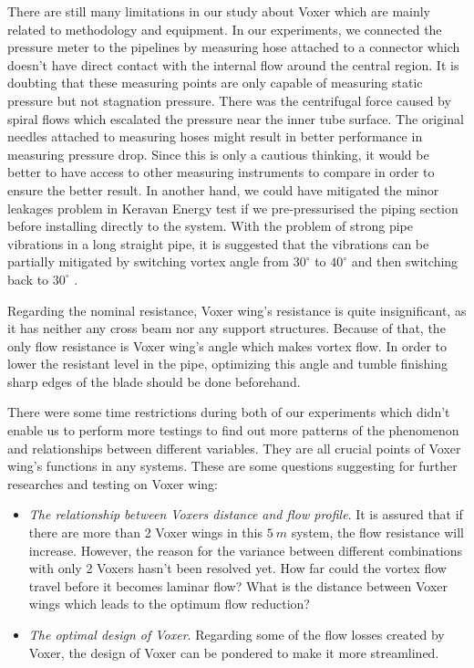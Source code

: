 There are still many limitations in our study about Voxer which are mainly related to methodology and equipment. In our experiments, we connected the pressure meter to the pipelines by measuring hose attached to a connector which doesn't have direct contact with the internal flow around the central region. It is doubting that these measuring points are only capable of measuring static pressure but not stagnation pressure. There was the centrifugal force caused by spiral flows which escalated the pressure near the inner tube surface. The original needles \cite{danfoss:web} attached to measuring hoses might result in better performance in measuring pressure drop. Since this is only a cautious thinking, it would be better to have access to other measuring instruments to compare in order to ensure the better result. 
In another hand, we could have mitigated the minor leakages problem in Keravan Energy test if we pre-pressurised the piping section before installing directly to the system. With the problem of strong pipe vibrations in a long straight pipe, it is suggested that the vibrations can be partially mitigated by switching vortex angle from $30^{\circ}$ to $40^{\circ}$  and then switching back to $30^{\circ}$ .

Regarding the nominal resistance, Voxer wing's resistance is quite insignificant, as it has neither any cross beam nor any support structures. Because of that, the only flow resistance is Voxer wing's angle which makes vortex flow. In order to lower the resistant level in the pipe, optimizing this angle and tumble finishing sharp edges of the blade should be done beforehand.

There were some time restrictions during both of our experiments which didn't enable us to perform more testings to find out more patterns of the phenomenon and relationships between different variables. They are all crucial points of Voxer wing's functions in any systems. These are some questions suggesting for further researches and testing on Voxer wing:
\begin{itemize}
  \item \textit{The relationship between Voxers distance and flow profile}. It is assured that if there are more than 2 Voxer wings in this $5\ m$ system, the flow resistance will increase. However, the reason for the variance between different combinations with only 2 Voxers hasn't been resolved yet. How far could the vortex flow travel before it becomes laminar flow? What is the distance between Voxer wings which leads to the optimum flow reduction? 
  \item \textit{The optimal design of Voxer}. Regarding some of the flow losses created by Voxer, the design of Voxer can be pondered to make it more streamlined. 
\end{itemize} 


